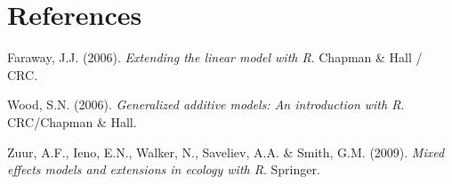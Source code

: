 \documentclass[
  letterpaper,
  DIV=11,
  numbers=noendperiod]{scrartcl}
\newlength{\cslhangindent}
\newenvironment{CSLReferences}[2] %
 {\begin{list}{}{%
  \setlength{\itemindent}{0pt}
  \setlength{\leftmargin}{0pt}
  \setlength{\parsep}{0pt}
  \ifodd #1
   \setlength{\leftmargin}{\cslhangindent}
   \setlength{\itemindent}{-1\cslhangindent}
  \fi
  \setlength{\itemsep}{#2\baselineskip}}}
 {\end{list}}
\begin{document}
\section*{References}\label{references}

\protect{}\label{refs}
\begin{CSLReferences}{1}{1}
Faraway, J.J. (2006). \emph{Extending the linear model with {R}}.
Chapman \& Hall / CRC.

Wood, S.N. (2006). \emph{Generalized additive models: An introduction
with {R}}. CRC/Chapman \& Hall.

Zuur, A.F., Ieno, E.N., Walker, N., Saveliev, A.A. \& Smith, G.M.
(2009). \emph{Mixed effects models and extensions in ecology with {R}}.
Springer.

\end{CSLReferences}
\end{document}
